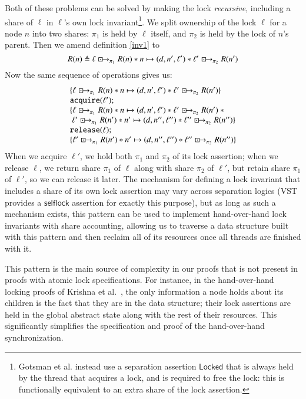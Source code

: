 \documentclass[runningheads]{llncs}
\newcommand{\islock}{\boxdotright}
\begin{document}
Both of these problems can be solved by making the lock \emph{recursive}, including a share of $\ell$ in $\ell$'s own lock invariant\footnote{Gotsman et al. instead use a separation assertion $\mathsf{Locked}$ that is always held by the thread that acquires a lock, and is required to free the lock: this is functionally equivalent to an extra share of the lock assertion.}. We split ownership of the lock $\ell$ for a node $n$ into two shares: $\pi_1$ is held by $\ell$ itself, and $\pi_2$ is held by the lock of $n$'s parent. Then we amend definition \ref{inv1} to
\[R(n) \triangleq \ell \islock_{\pi_1} R(n) * n \mapsto (d, n', \ell') * \ell' \islock_{\pi_2} R(n')\]
Now the same sequence of operations gives us:
\[\begin{array}{l}
\{ \ell \islock_{\pi_1} R(n) * n \mapsto (d, n', \ell') * \ell' \islock_{\pi_2} R(n') \}\\
\texttt{acquire}(\ell');\\
\{ \ell \islock_{\pi_1} R(n) * n \mapsto (d, n', \ell') * \ell' \islock_{\pi_2} R(n')\ * \\\ \ell' \islock_{\pi_1} R(n') * n' \mapsto (d, n'', \ell'') * \ell'' \islock_{\pi_2} R(n'') \}\\
\texttt{release}(\ell);\\
\{ \ell' \islock_{\pi_1} R(n') * n' \mapsto (d, n'', \ell'') * \ell'' \islock_{\pi_2} R(n'') \}
\end{array}\]
When we acquire $\ell'$, we hold both $\pi_1$ and $\pi_2$ of its lock assertion; when we release $\ell$, we return share $\pi_1$ of $\ell$ along with share $\pi_2$ of $\ell'$, but retain share $\pi_1$ of $\ell'$, so we can release it later. The mechanism for defining a lock invariant that includes a share of its own lock assertion may vary across separation logics (VST provides a $\mathsf{selflock}$ assertion for exactly this purpose), but as long as such a mechanism exists, this pattern can be used to implement hand-over-hand lock invariants with share accounting, allowing us to traverse a data structure built with this pattern and then reclaim all of its resources once all threads are finished with it.

This pattern is the main source of complexity in our proofs that is not present in proofs with atomic lock specifications. For instance, in the hand-over-hand locking proofs of Krishna et al.~\cite{templates}, the only information a node holds about its children is the fact that they are in the data structure; their lock assertions are held in the global abstract state along with the rest of their resources. This significantly simplifies the specification and proof of the hand-over-hand synchronization.
\end{document}
